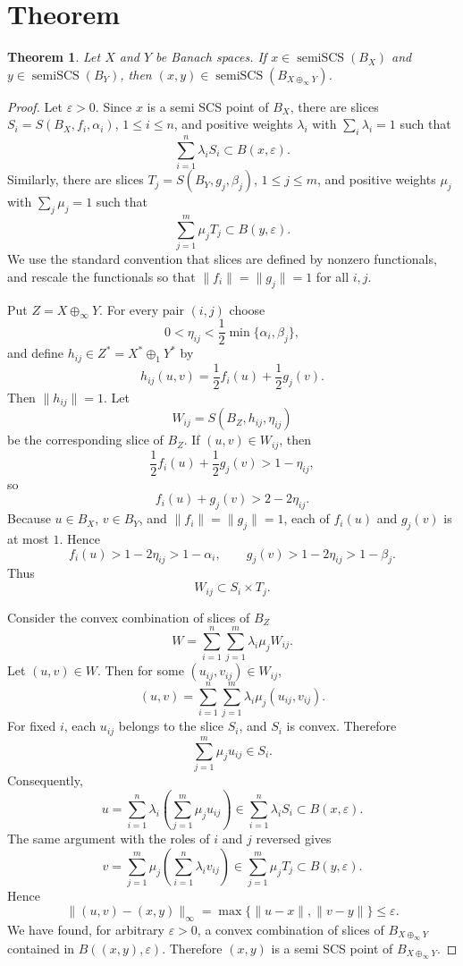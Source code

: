 \documentclass[11pt]{article}
\newtheorem*{theorem*}{Theorem}
\begin{document}
\section*{Theorem}

\begin{theorem*}
Let $X$ and $Y$ be Banach spaces. If $x\in \operatorname{semiSCS}(B_X)$ and
$y\in \operatorname{semiSCS}(B_Y)$, then
$(x,y)\in \operatorname{semiSCS}(B_{X\oplus_\infty Y})$.
\end{theorem*}

\begin{proof}
Let $\varepsilon>0$. Since $x$ is a semi SCS point of $B_X$, there are slices
$S_i=S(B_X,f_i,\alpha_i)$, $1\leq i\leq n$, and positive weights
$\lambda_i$ with $\sum_i\lambda_i=1$ such that
\[
  \sum_{i=1}^n \lambda_i S_i \subset B(x,\varepsilon).
\]
Similarly, there are slices $T_j=S(B_Y,g_j,\beta_j)$, $1\leq j\leq m$, and
positive weights $\mu_j$ with $\sum_j\mu_j=1$ such that
\[
  \sum_{j=1}^m \mu_j T_j \subset B(y,\varepsilon).
\]
We use the standard convention that slices are defined by nonzero functionals,
and rescale the functionals so that $\|f_i\|=\|g_j\|=1$ for all $i,j$.

Put $Z=X\oplus_\infty Y$. For every pair $(i,j)$ choose
\[
  0<\eta_{ij}<\frac12\min\{\alpha_i,\beta_j\},
\]
and define $h_{ij}\in Z^*=X^*\oplus_1Y^*$ by
\[
  h_{ij}(u,v)=\frac12 f_i(u)+\frac12 g_j(v).
\]
Then $\|h_{ij}\|=1$. Let
\[
  W_{ij}=S(B_Z,h_{ij},\eta_{ij})
\]
be the corresponding slice of $B_Z$. If $(u,v)\in W_{ij}$, then
\[
  \frac12 f_i(u)+\frac12 g_j(v)>1-\eta_{ij},
\]
so
\[
  f_i(u)+g_j(v)>2-2\eta_{ij}.
\]
Because $u\in B_X$, $v\in B_Y$, and $\|f_i\|=\|g_j\|=1$, each of
$f_i(u)$ and $g_j(v)$ is at most $1$. Hence
\[
  f_i(u)>1-2\eta_{ij}>1-\alpha_i,\qquad
  g_j(v)>1-2\eta_{ij}>1-\beta_j.
\]
Thus
\[
  W_{ij}\subset S_i\times T_j.
\]

Consider the convex combination of slices of $B_Z$
\[
  W=\sum_{i=1}^n\sum_{j=1}^m \lambda_i\mu_j W_{ij}.
\]
Let $(u,v)\in W$. Then for some $(u_{ij},v_{ij})\in W_{ij}$,
\[
  (u,v)=\sum_{i=1}^n\sum_{j=1}^m \lambda_i\mu_j (u_{ij},v_{ij}).
\]
For fixed $i$, each $u_{ij}$ belongs to the slice $S_i$, and $S_i$ is convex.
Therefore
\[
  \sum_{j=1}^m \mu_j u_{ij}\in S_i.
\]
Consequently,
\[
  u=\sum_{i=1}^n \lambda_i\left(\sum_{j=1}^m \mu_j u_{ij}\right)
    \in \sum_{i=1}^n \lambda_iS_i\subset B(x,\varepsilon).
\]
The same argument with the roles of $i$ and $j$ reversed gives
\[
  v=\sum_{j=1}^m \mu_j\left(\sum_{i=1}^n \lambda_i v_{ij}\right)
    \in \sum_{j=1}^m \mu_jT_j\subset B(y,\varepsilon).
\]
Hence
\[
  \|(u,v)-(x,y)\|_\infty
  =\max\{\|u-x\|,\|v-y\|\}\leq \varepsilon.
\]
We have found, for arbitrary $\varepsilon>0$, a convex combination of slices
of $B_{X\oplus_\infty Y}$ contained in $B((x,y),\varepsilon)$. Therefore
$(x,y)$ is a semi SCS point of $B_{X\oplus_\infty Y}$.
\end{proof}
\end{document}
